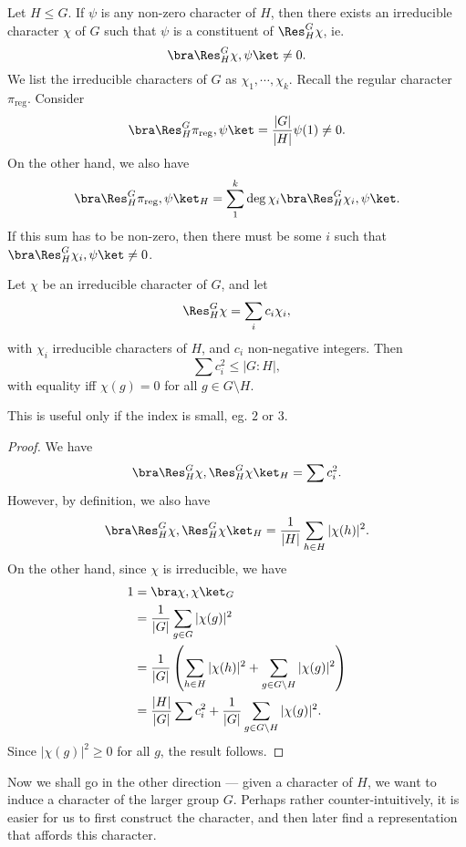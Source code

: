\documentclass[a4paper]{article}
\begin{document}
\begin{lemma}
  Let $H \leq G$. If $\psi$ is any non-zero character of $H$, then there exists an irreducible character $\chi$ of $G$ such that $\psi$ is a constituent of $\Res_H^G \chi$, ie.
  \[
    \bra \Res^G_H \chi, \psi \ket \not= 0.
  \]
  We list the irreducible characters of $G$ as $\chi_1, \cdots, \chi_k$. Recall the regular character $\pi_{\mathrm{reg}}$. Consider
  \[
    \bra \Res^G_H\pi_{\mathrm{reg}}, \psi\ket = \frac{|G|}{|H|} \psi(1) \not= 0.
  \]
  On the other hand, we also have
  \[
    \bra \Res^G_H\pi_{\mathrm{reg}}, \psi\ket_H = \sum_{1}^k \deg \chi_i \bra \Res^G_H \chi_i, \psi\ket.
  \]
  If this sum has to be non-zero, then there must be some $i$ such that $\bra \Res^G_H \chi_i, \psi\ket \not= 0$.
\end{lemma}

\begin{lemma}
  Let $\chi$ be an irreducible character of $G$, and let
  \[
    \Res^G_H \chi = \sum_i c_i \chi_i,
  \]
  with $\chi_i$ irreducible characters of $H$, and $c_i$ non-negative integers. Then
  \[
    \sum c_i^2 \leq |G:H|,
  \]
  with equality iff $\chi(g) = 0$ for all $g \in G\setminus H$.
\end{lemma}
This is useful only if the index is small, eg. $2$ or $3$.
\begin{proof}
  We have
  \[
    \bra \Res^G_H \chi, \Res^G_H \chi\ket_H = \sum c_i^2.
  \]
  However, by definition, we also have
  \[
    \bra \Res^G_H \chi, \Res^G_H \chi\ket_H = \frac{1}{|H|}\sum_{h \in H} |\chi(h)|^2.
  \]
  On the other hand, since $\chi$ is irreducible, we have
  \begin{align*}
    1 &= \bra \chi, \chi\ket_G\\
    &= \frac{1}{|G|}\sum_{g \in G} |\chi(g)|^2 \\
    &= \frac{1}{|G|} \left(\sum_{h \in H} |\chi(h)|^2 + \sum_{g \in G\setminus H} |\chi(g)|^2\right)\\
    &= \frac{|H|}{|G|} \sum c_i^2 + \frac{1}{|G|} \sum_{g \in G \setminus H} |\chi(g)|^2.
  \end{align*}
  Since $|\chi(g)|^2 \geq 0$ for all $g$, the result follows.
\end{proof}

Now we shall go in the other direction --- given a character of $H$, we want to induce a character of the larger group $G$. Perhaps rather counter-intuitively, it is easier for us to first construct the character, and then later find a representation that affords this character.
\end{document}
